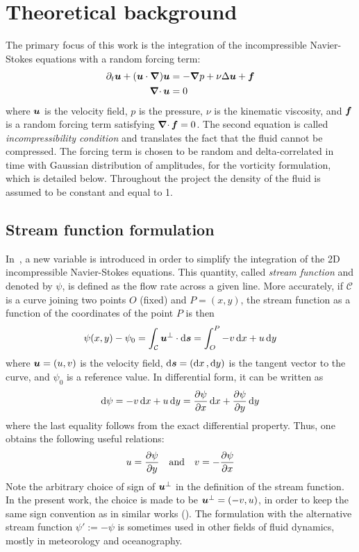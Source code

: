 \documentclass[../main.tex]{subfiles}
\begin{document}
\section{Theoretical background}\label{sec:equations}
The primary focus of this work is the integration of the incompressible Navier-Stokes equations with a random forcing term:
\begin{align}
	\label{eq:navier-stokes}\partial_t \boldsymbol{u} + (\boldsymbol{u} \cdot \grad) \boldsymbol{u} & = -\grad p + \nu\Delta \boldsymbol{u} + \boldsymbol{f} \\
	\label{eq:incompressibility}\operatorname{\boldsymbol{\nabla}\cdot}{\boldsymbol{u}}                               & = 0
\end{align}
where $\boldsymbol{u}$ is the velocity field, $p$ is the pressure, $\nu$ is the kinematic viscosity, and $\boldsymbol{f}$ is a random forcing term satisfying $\operatorname{\boldsymbol{\nabla}\cdot}{\boldsymbol{f}}=0$. The second equation is called	\emph{incompressibility condition} and translates the fact that the fluid cannot be compressed. The forcing term is chosen to be random and delta-correlated in time with Gaussian distribution of amplitudes, for the vorticity formulation, which is detailed below. Throughout the project the density of the fluid is assumed to be constant and equal to 1.

\subsection{Stream function formulation}
In~\cite{Batchelor2000}, a new variable is introduced in order to simplify the integration of the 2D incompressible Navier-Stokes equations. This quantity, called \emph{stream function} and denoted by $\psi$, is defined as the flow rate across a given line. More accurately, if $\mathcal{C}$ is a curve joining two points $O$ (fixed) and $P=(x,y)$, the stream function as a function of the coordinates of the point $P$ is then
\begin{equation}
	\psi(x,y) -\psi_0 = \int_{\mathcal{C}} \boldsymbol{u}^\perp \cdot \dd{\boldsymbol{s}}= \int_{O}^{P} -v \dd{x} + u \dd{y}
\end{equation}
where $\boldsymbol{u} = (u,v)$ is the velocity field, $\dd{\boldsymbol{s}}=(\dd{x},\dd{y})$ is the tangent vector to the curve, and $\psi_0$ is a reference value. In differential form, it can be written as
\begin{equation}
	\dd{\psi} = -v \dd{x} + u \dd{y} = \pdv{\psi}{x} \dd{x} + \pdv{\psi}{y} \dd{y}
\end{equation}
where the last equality follows from the exact differential property. Thus, one obtains the following useful relations:
\begin{equation}
	u = \pdv{\psi}{y} \quad \text{and} \quad v = -\pdv{\psi}{x}
\end{equation}
Note the arbitrary choice of sign of $\boldsymbol{u}^\perp$ in the definition of the stream function. In the present work, the choice is made to be $\boldsymbol{u}^\perp = (-v,u)$, in order to keep the same sign convention as in similar works (\cite{2dturbulence,alexakisLONG}). The formulation with the alternative stream function $\psi':=-\psi$ is sometimes used in other fields of fluid dynamics, mostly in meteorology and oceanography.
\end{document}
